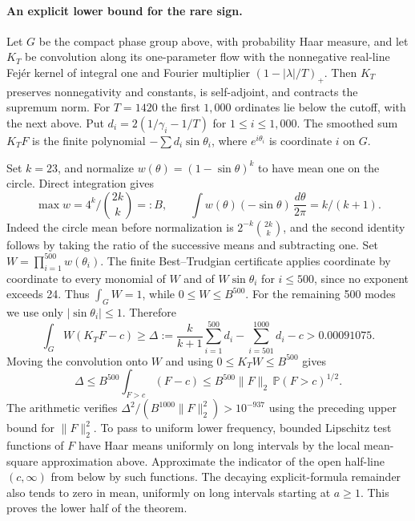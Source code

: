 \paragraph{An explicit lower bound for the rare sign.}
Let $G$ be the compact phase group above, with probability Haar measure,
and let $K_T$ be convolution along its one-parameter flow with the
nonnegative real-line Fej\'er kernel of integral one and Fourier multiplier
$(1-|\lambda|/T)_+$. Then $K_T$ preserves nonnegativity and constants,
is self-adjoint, and contracts the supremum norm. For $T=1420$ the first
$1{,}000$ ordinates lie below the cutoff, with the next above. Put
$d_i=2(1/\gamma_i-1/T)$ for $1\le i\le 1{,}000$. The smoothed sum
$K_TF$ is the finite polynomial $-\sum d_i\sin\theta_i$, where
$e^{i\theta_i}$ is coordinate $i$ on $G$.

Set $k=23$, and normalize $w(\theta)=(1-\sin\theta)^k$ to have
mean one on the circle. Direct integration gives
\[
  \max w=4^k/\binom{2k}{k}=:B,\qquad
  \int w(\theta)(-\sin\theta)\,\frac{d\theta}{2\pi}=k/(k+1).
\]
Indeed the circle mean before normalization is
$2^{-k}\binom{2k}{k}$, and the second identity follows by taking the
ratio of the successive means and subtracting one. Set
$W=\prod_{i=1}^{500}w(\theta_i)$. The finite Best--Trudgian certificate
applies coordinate by coordinate to every monomial of $W$ and of
$W\sin\theta_i$ for $i\le500$, since no exponent exceeds 24. Thus
$\int_G W=1$, while $0\le W\le B^{500}$. For the remaining 500 modes we
use only $|\sin\theta_i|\le1$. Therefore
\[
 \int_G W(K_TF-c)\ge
 \Delta :=\frac{k}{k+1}\sum_{i=1}^{500}d_i
     -\sum_{i=501}^{1000}d_i-c>0.00091075.
\]
Moving the convolution onto $W$ and using $0\le K_TW\le B^{500}$ gives
\[
 \Delta\le B^{500}\int_{F>c}(F-c)\le
 B^{500}\|F\|_2\,\mathbb P(F>c)^{1/2}.
\]
The arithmetic verifies $\Delta^2/(B^{1000}\|F\|_2^2)>10^{-937}$ using
the preceding upper bound for $\|F\|_2^2$.
To pass to uniform lower frequency, bounded Lipschitz test functions of
$F$ have Haar means uniformly on long intervals by the local mean-square
approximation above. Approximate the indicator of the open half-line
$(c,\infty)$ from below by such functions. The decaying explicit-formula
remainder also tends to zero in mean, uniformly on long intervals
starting at $a\ge1$. This proves the lower half of the theorem.
